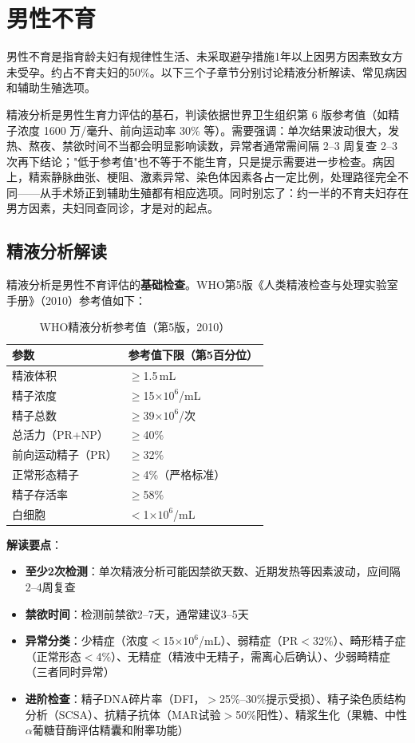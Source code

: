 \section{男性不育}

男性不育是指育龄夫妇有规律性生活、未采取避孕措施1年以上因男方因素致女方未受孕。约占不育夫妇的50\%。以下三个子章节分别讨论精液分析解读、常见病因和辅助生殖选项。


精液分析是男性生育力评估的基石，判读依据世界卫生组织第 6 版参考值（如精子浓度 1600 万/毫升、前向运动率 30\% 等）。需要强调：单次结果波动很大，发热、熬夜、禁欲时间不当都会明显影响读数，异常者通常需间隔 2--3 周复查 2--3 次再下结论；"低于参考值"也不等于不能生育，只是提示需要进一步检查。病因上，精索静脉曲张、梗阻、激素异常、染色体因素各占一定比例，处理路径完全不同——从手术矫正到辅助生殖都有相应选项。同时别忘了：约一半的不育夫妇存在男方因素，夫妇同查同诊，才是对的起点。

\subsection{精液分析解读}

精液分析是男性不育评估的\textbf{基础检查}。WHO第5版《人类精液检查与处理实验室手册》（2010）参考值如下：

\begin{table}[htbp]
\centering
\caption{WHO精液分析参考值（第5版，2010）}
\label{tab:semen_analysis_who}
\begin{tabularx}{\textwidth}{@{}lX@{}}
    \toprule
    \textbf{参数} & \textbf{参考值下限（第5百分位）} \\
    \midrule
    精液体积 & $\ge$1.5\,mL \\
    精子浓度 & $\ge$15$\times10^6$/mL \\
    精子总数 & $\ge$39$\times10^6$/次 \\
    总活力（PR+NP） & $\ge$40\% \\
    前向运动精子（PR） & $\ge$32\% \\
    正常形态精子 & $\ge$4\%（严格标准） \\
    精子存活率 & $\ge$58\% \\
    白细胞 & $<$1$\times10^6$/mL \\
    \bottomrule
\end{tabularx}
\end{table}

\textbf{解读要点}：
\begin{itemize}[leftmargin=2cm]
	\item \textbf{至少2次检测}：单次精液分析可能因禁欲天数、近期发热等因素波动，应间隔2--4周复查
	\item \textbf{禁欲时间}：检测前禁欲2--7天，通常建议3--5天
	\item \textbf{异常分类}：少精症（浓度$<$15$\times10^6$/mL）、弱精症（PR$<$32\%）、畸形精子症（正常形态$<$4\%）、无精症（精液中无精子，需离心后确认）、少弱畸精症（三者同时异常）
	\item \textbf{进阶检查}：精子DNA碎片率（DFI，$>$25\%--30\%提示受损）、精子染色质结构分析（SCSA）、抗精子抗体（MAR试验$>$50\%阳性）、精浆生化（果糖、中性$\alpha$葡糖苷酶评估精囊和附睾功能）
\end{itemize}

